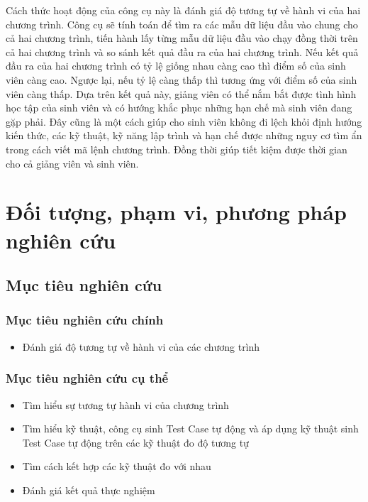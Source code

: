 Cách thức hoạt động của công cụ này là đánh giá độ tương tự về hành vi của hai chương trình. Công cụ sẽ tính toán để tìm ra các mẫu dữ liệu đầu vào chung cho cả hai chương trình, tiến hành lấy từng mẫu dữ liệu đầu vào chạy đồng thời trên cả hai chương trình và so sánh kết quả đầu ra của hai chương trình. Nếu kết quả đầu ra của hai chương trình có tỷ lệ giống nhau càng cao thì điểm số của sinh viên càng cao. Ngược lại, nếu tỷ lệ càng thấp thì tương ứng với điểm số của sinh viên càng thấp. Dựa trên kết quả này, giảng viên có thể nắm bắt được tình hình học tập của sinh viên và có hướng khắc phục những hạn chế mà sinh viên đang gặp phải. Đây cũng là một cách giúp cho sinh viên không đi lệch khỏi định hướng kiến thức, các kỹ thuật, kỹ năng lập trình và hạn chế được những nguy cơ tìm ẩn trong cách viết mã lệnh chương trình. Đồng thời giúp tiết kiệm được thời gian cho cả giảng viên và sinh viên.

\section{Đối tượng, phạm vi, phương pháp nghiên cứu}
	\subsection*{Mục tiêu nghiên cứu}
		\subsubsection*{Mục tiêu nghiên cứu chính}
		\begin{itemize}
		\item Đánh giá độ tương tự về hành vi của các chương trình
		\end{itemize}
		
		\subsubsection*{Mục tiêu nghiên cứu cụ thể}
		\begin{itemize}
		\item Tìm hiểu sự tương tự hành vi của chương trình
		\item Tìm hiểu kỹ thuật, công cụ sinh Test Case tự động và áp dụng kỹ thuật sinh Test Case tự động trên các kỹ thuật đo độ tương tự
		\item Tìm cách kết hợp các kỹ thuật đo với nhau
		\item Đánh giá kết quả thực nghiệm
		\end{itemize}

